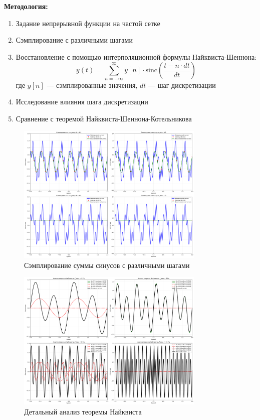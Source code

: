 \textbf{Методология:}
\begin{enumerate}
    \item Задание непрерывной функции на частой сетке
    \item Сэмплирование с различными шагами
    \item Восстановление с помощью интерполяционной формулы Найквиста-Шеннона:
    \begin{equation}
    y(t) = \sum_{n=-\infty}^{\infty} y[n] \cdot \text{sinc}\left(\frac{t - n \cdot dt}{dt}\right)
    \end{equation}
    где $y[n]$ — сэмплированные значения, $dt$ — шаг дискретизации
    \item Исследование влияния шага дискретизации
    \item Сравнение с теоремой Найквиста-Шеннона-Котельникова
\end{enumerate}

\begin{figure}[H]
    \centering
    \includegraphics[width=0.8\textwidth]{images/task2/sampling_sines.png}
    \caption{Сэмплирование суммы синусов с различными шагами}
    \label{fig:sampling_sines}
\end{figure}

\begin{figure}[H]
    \centering
    \includegraphics[width=0.8\textwidth]{images/task2/nyquist_analysis.png}
    \caption{Детальный анализ теоремы Найквиста}
    \label{fig:nyquist_analysis}
\end{figure}

